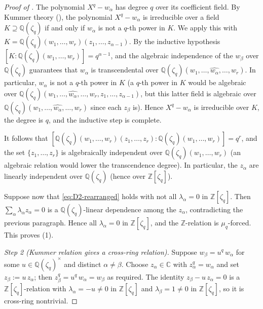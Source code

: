 \documentclass[11pt,a4paper]{article}
\theoremstyle{plain}
\theoremstyle{definition}
\theoremstyle{remark}
\newcommand{\Zlc}{\mathbb{Z}[\zeta_q]}
\newcommand{\Qlc}{\mathbb{Q}(\zeta_q)}
\begin{document}
\begin{proof}[Proof of ]
The polynomial $X^q - w_\alpha$ has degree $q$ over its coefficient
field. By Kummer theory (\cite[Ch.~VI, Thm.~9.1]{lang-algebra}), the
polynomial $X^q - w_\alpha$ is irreducible over a field $K \supseteq
\Qlc$ if and only if $w_\alpha$ is not a $q$-th power in $K$. We
apply this with $K = \Qlc(w_1, \dots, w_r)(z_1, \dots, z_{\alpha - 1})$.
By the inductive hypothesis $[K : \Qlc(w_1, \dots, w_r)] = q^{\alpha - 1}$,
and the algebraic independence of the $w_\beta$ over $\Qlc$ guarantees
that $w_\alpha$ is transcendental over $\Qlc(w_1, \dots,
\widehat{w_\alpha}, \dots, w_r)$. In particular, $w_\alpha$ is not a
$q$-th power in $K$ (a $q$-th power in $K$ would be algebraic over
$\Qlc(w_1, \dots, \widehat{w_\alpha}, \dots, w_r, z_1, \dots,
z_{\alpha - 1})$, but this latter field is algebraic over
$\Qlc(w_1, \dots, \widehat{w_\alpha}, \dots, w_r)$ since each
$z_\beta$ is). Hence $X^q - w_\alpha$ is irreducible over $K$, the
degree is $q$, and the inductive step is complete.

It follows that
$[\Qlc(w_1, \dots, w_r)(z_1, \dots, z_r) :
\Qlc(w_1, \dots, w_r)] = q^r$, and the set $\{z_1, \dots, z_r\}$ is
algebraically independent over $\Qlc(w_1, \dots, w_r)$ (an algebraic
relation would lower the transcendence degree). In particular, the
$z_\alpha$ are linearly independent over $\Qlc$ (hence over $\Zlc$).

Suppose now that \eqref{eq:D2-rearranged} holds with not all
$\lambda_\alpha = 0$ in $\Zlc$. Then $\sum_\alpha \lambda_\alpha z_\alpha
= 0$ is a $\Qlc$-linear dependence among the $z_\alpha$, contradicting
the previous paragraph. Hence all $\lambda_\alpha = 0$ in $\Zlc$, and
the $\mathbb{Z}$-relation is $\mu_q$-forced. This proves (1).

\smallskip
\textit{Step 2 (Kummer relation gives a cross-ring relation).}
Suppose $w_\beta = u^q\, w_\alpha$ for some $u \in \Qlc^\times$ and
distinct $\alpha \ne \beta$. Choose $z_\alpha \in \mathbb{C}$ with
$z_\alpha^q = w_\alpha$ and set $z_\beta := u\, z_\alpha$; then
$z_\beta^q = u^q\, w_\alpha = w_\beta$ as required. The identity
$z_\beta - u\, z_\alpha = 0$ is a $\Zlc$-relation with $\lambda_\alpha
= -u \ne 0$ in $\Zlc$ and $\lambda_\beta = 1 \ne 0$ in $\Zlc$, so it
is cross-ring nontrivial.


\end{proof}
\end{document}
